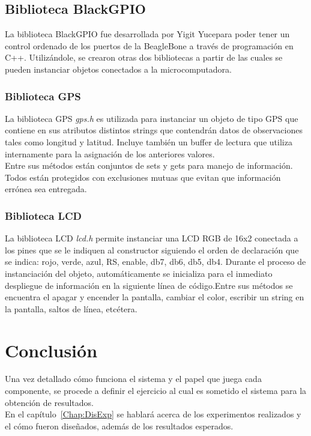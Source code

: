 \subsection{Biblioteca BlackGPIO}

La biblioteca BlackGPIO fue desarrollada por Yigit Yuce\footnotemark para poder tener un control ordenado de los puertos de la BeagleBone a través de programación en C++. Utilizándole, se crearon otras dos bibliotecas a partir de las cuales se pueden instanciar objetos conectados a la microcomputadora.


\subsubsection{Biblioteca GPS}

La biblioteca GPS \textit{gps.h} es utilizada para instanciar un objeto de tipo GPS que contiene en sus atributos distintos strings que contendrán datos de observaciones tales como longitud y latitud. Incluye también un buffer de lectura que utiliza internamente para la asignación de los anteriores valores.\\

Entre sus métodos están conjuntos de sets y gets para manejo de información. Todos están protegidos con exclusiones mutuas que evitan que información errónea sea entregada.

\subsubsection{Biblioteca LCD}

La biblioteca LCD \textit{lcd.h} permite instanciar una LCD RGB de 16x2 conectada a los pines que se le indiquen al constructor siguiendo el orden de declaración que se indica: rojo, verde, azul, RS, enable, db7, db6, db5, db4. Durante el proceso de instanciación del objeto, automáticamente se inicializa para el inmediato despliegue de información en  la siguiente línea de código.Entre sus métodos se encuentra el apagar y encender la pantalla, cambiar el color, escribir un string en la pantalla, saltos de línea, etcétera.

\section{Conclusión}

Una vez detallado cómo funciona el sistema y el papel que juega cada componente, se procede a definir el ejercicio al cual es sometido el sistema para la obtención de resultados.\\
 
En el capítulo~\ref{Chap:DisExp} se hablará acerca de los experimentos realizados y el cómo fueron diseñados, además de los resultados esperados.